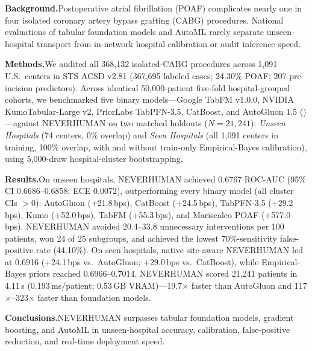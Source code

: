\begin{nejmabstract}
\noindent\textbf{Background.}\hspace{0.4em}Postoperative atrial fibrillation (POAF) complicates nearly one in four isolated coronary artery bypass grafting (CABG) procedures. National evaluations of tabular foundation models and AutoML rarely separate unseen-hospital transport from in-network hospital calibration or audit inference speed.

\vspace{3pt}
\noindent\textbf{Methods.}\hspace{0.4em}We audited all 368,132 isolated-CABG procedures across 1,091 U.S.\ centers in STS ACSD v2.81 (367,695 labeled cases; 24.30\% POAF; 207 pre-incision predictors). Across identical 50,000-patient five-fold hospital-grouped cohorts, we benchmarked five binary models---Google TabFM v1.0.0, NVIDIA KumoTabular-Large v2, PriorLabs TabPFN-3.5, CatBoost, and AutoGluon 1.5 ()---against NEVERHUMAN on two matched holdouts ($N{=}21{,}241$): \emph{Unseen Hospitals} (74 centers, 0\% overlap) and \emph{Seen Hospitals} (all 1,091 centers in training, 100\% overlap, with and without train-only Empirical-Bayes calibration), using 5,000-draw hospital-cluster bootstrapping.

\vspace{3pt}
\noindent\textbf{Results.}\hspace{0.4em}On unseen hospitals, NEVERHUMAN achieved 0.6767 ROC-AUC (95\% CI 0.6686--0.6858; ECE 0.0072), outperforming every binary model (all cluster CIs $>0$): AutoGluon (+21.8\,bps), CatBoost (+24.5\,bps), TabPFN-3.5 (+29.2\,bps), Kumo (+52.0\,bps), TabFM (+55.3\,bps), and Mariscalco POAF (+577.0\,bps). NEVERHUMAN avoided 20.4--33.8 unnecessary interventions per 100 patients, won 24 of 25 subgroups, and achieved the lowest 70\%-sensitivity false-positive rate (44.10\%). On seen hospitals, native site-aware NEVERHUMAN led at 0.6916 (+24.1\,bps vs.\ AutoGluon; +29.0\,bps vs.\ CatBoost), while Empirical-Bayes priors reached 0.6966--0.7014. NEVERHUMAN scored 21,241 patients in 4.11\,s (0.193\,ms/patient; 0.53\,GB VRAM)---19.7$\times$ faster than AutoGluon and 117$\times$--323$\times$ faster than foundation models.

\vspace{3pt}
\noindent\textbf{Conclusions.}\hspace{0.4em}NEVERHUMAN surpasses tabular foundation models, gradient boosting, and AutoML in unseen-hospital accuracy, calibration, false-positive reduction, and real-time deployment speed.
\end{nejmabstract}
